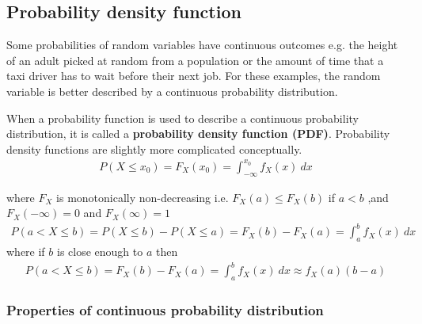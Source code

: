 \documentclass[10pt,a4paper]{article}
\begin{document}
\subsection{Probability density function}

Some probabilities of random variables have continuous outcomes e.g. the height of an adult picked
at random from a population or the amount of time that a taxi driver has to wait before their next
job. For these examples, the random variable is better described by a continuous probability
distribution.

When a probability function is used to describe a continuous probability distribution, it is called
a \textbf{probability density function (PDF)}. Probability density functions are slightly more
complicated conceptually. 
\begin{align*}
    P(X\leq x_0) = F_X (x_0) = \int_{-\infty}^{x_0} f_X (x)\: dx
\end{align*}

where $F_X$ is monotonically non-decreasing i.e. $F_X(a) \leq F_X(b)$ if $a<b$ ,and $F_X(-\infty)=0$
and $F_X(\infty)=1$
\begin{align*}
    P(a<X\leq b) = P(X\leq b)-P(X\leq a) = F_X(b)-F_X(a) = \int_a^b f_X(x) \: dx
\end{align*}
where if $b$ is close enough to $a$ then
\begin{align*}
    P(a<X\leq b) = F_X(b)-F_X(a) = \int_a^b f_X(x)\: dx \approx f_X(a)(b-a)
\end{align*}

\subsubsection{Properties of continuous probability distribution}
\end{document}
